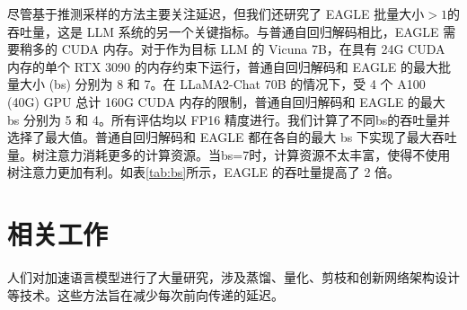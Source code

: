 \documentclass{article}
\theoremstyle{plain}
\theoremstyle{definition}
\theoremstyle{remark}
\begin{document}
尽管基于推测采样的方法主要关注延迟，但我们还研究了 EAGLE 批量大小$>1$的吞吐量，这是 LLM 系统的另一个关键指标。与普通自回归解码相比，EAGLE 需要稍多的 CUDA 内存。对于作为目标 LLM 的 Vicuna 7B，在具有 24G CUDA 内存的单个 RTX 3090 的内存约束下运行，普通自回归解码和 EAGLE 的最大批量大小 (bs) 分别为 8 和 7。在 LLaMA2-Chat 70B 的情况下，受 4 个 A100 (40G) GPU 总计 160G CUDA 内存的限制，普通自回归解码和 EAGLE 的最大 bs 分别为 5 和 4。所有评估均以 FP16 精度进行。我们计算了不同bs的吞吐量并选择了最大值。普通自回归解码和 EAGLE 都在各自的最大 bs 下实现了最大吞吐量。树注意力消耗更多的计算资源。当bs=7时，计算资源不太丰富，使得不使用树注意力更加有利。如表\ref{tab:bs}所示，EAGLE 的吞吐量提高了 2 倍。

\begin{table}
  \centering
  \caption{EAGLE 不同批量大小和吞吐量下的加速比。评估数据集为MT-bench，温度参数设置为0。}
  \label{tab:bs}%
\end{table}%









\section{相关工作}

人们对加速语言模型进行了大量研究，涉及蒸馏\cite{hinton2015distilling}、量化\cite{hubara2018quantized,shen2020q,kim2021bert,zadeh2020gobo,zafrir2019q8bert}、剪枝\cite{gale2019state,sanh2020movement,kurtic2022optimal,voita2019analyzing}和创新网络架构设计\cite{gu2023mamba,wu2020lite}等技术。这些方法旨在减少每次前向传递的延迟。
\end{document}
